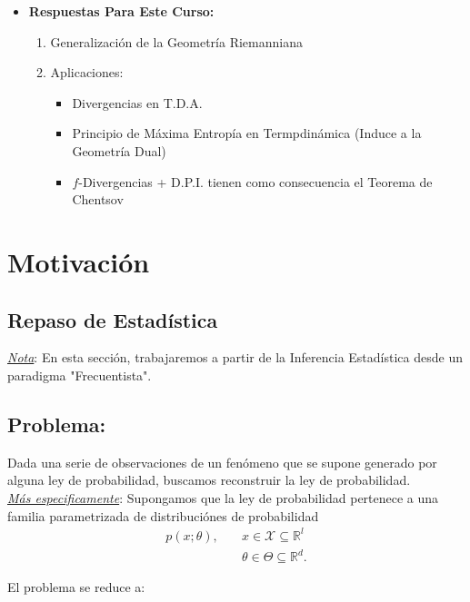 \begin{itemize}
    \item \textbf{Respuestas Para Este Curso:} 
    \begin{enumerate}[label=(\alph*)]
        \item Generalizaci\'on de la Geometr\'ia Riemanniana
        \item Aplicaciones:
        \begin{itemize}
            \item Divergencias en T.D.A.
            \item Principio de M\'axima Entrop\'ia en Termpdin\'amica (Induce a la Geometr\'ia Dual)
            \item $f$-Divergencias + D.P.I. tienen como consecuencia el Teorema de Chentsov
        \end{itemize}
    \end{enumerate}
\end{itemize}

\section{Motivaci\'on}

\subsection{Repaso de Estad\'istica}

\noindent\underline{\textit{Nota}}: En esta secci\'on, trabajaremos a partir de la Inferencia Estad\'istica desde un paradigma "Frecuentista". 


\subsection*{Problema:}

\noindent Dada una serie de observaciones de un fen\'omeno que se supone generado por alguna ley de probabilidad, buscamos reconstruir la ley de probabilidad. \\

\noindent\underline{\textit{M\'as especificamente}}: Supongamos que la ley de probabilidad pertenece a una familia parametrizada de distribuci\'ones 
de probabilidad
\begin{align*}
    p(x;\theta),\quad&x\in\mathcal{X}\subseteq\mathbb{R}^l\\
    &\theta\in\Theta\subseteq\mathbb{R}^d.
\end{align*}

El problema se reduce a:

